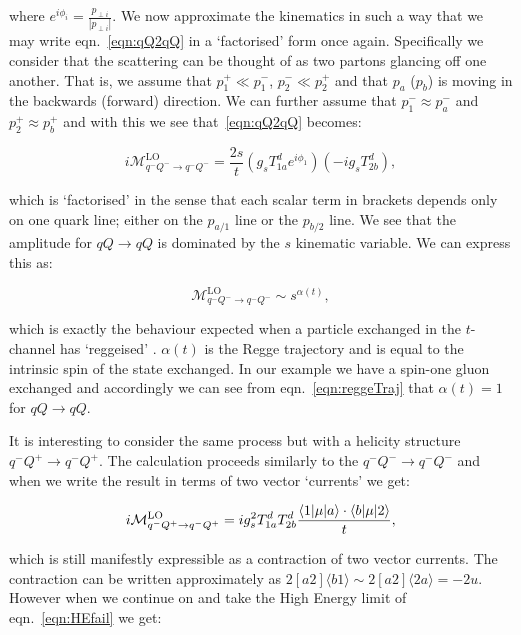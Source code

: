 		where $e^{i\phi_i} = \frac{p_{\perp i}}{|p_{\perp i}|}$.  We now approximate the kinematics in such a way that we may write
		eqn.~\eqref{eqn:qQ2qQ} in a `factorised' form once again.  Specifically we consider that the scattering can be thought
		of as two partons glancing off one another.  That is, we assume that $p_1^+\ll p_1^-$, $p_2^-\ll p_2^+$ and that $p_a$ ($p_b$)
		is moving in the backwards (forward) direction.  We can further assume that $p_1^-\approx p_a^-$ and $p_2^+\approx p_b^+$
		and with this we see that~\eqref{eqn:qQ2qQ} becomes:

		\begin{equation}
			i\mathcal{M}_{q^-Q^-\rightarrow q^-Q^-}^{\text{LO}} = \frac{2s}{t}\left(g_sT^d_{1a}e^{i\phi_1}\right)\left(-ig_sT^d_{2b}\right),
			\label{eqn:reggeTraj}
		\end{equation}

		which is `factorised' in the sense that each scalar term in brackets depends only on one quark line; either on the $p_{a/1}$
		line or the $p_{b/2}$ line.  We see that the amplitude for $qQ\rightarrow qQ$ is dominated by the $s$ kinematic variable.
		We can express this as:

		\begin{equation}
			\mathcal{M}_{q^-Q^-\rightarrow q^-Q^-}^{\text{LO}} \sim s^{\alpha(t)},
		\end{equation}

		which is exactly the behaviour expected when a particle exchanged in the $t$-channel has `reggeised'
		\cite{sabioThesis,DelDuca:1995hf,lipatovBook}.  $\alpha(t)$ is the Regge trajectory and is equal to
		the intrinsic spin of the state exchanged.  In our example we have a spin-one gluon exchanged
		and accordingly we can see from eqn.~\eqref{eqn:reggeTraj} that $\alpha(t)=1$ for $qQ\rightarrow qQ$.

		It is interesting to consider the same process but with a helicity structure $q^-Q^+\to q^-Q^+$.
		The calculation proceeds similarly to the $q^-Q^-\to q^-Q^-$ and when we write the result in
		terms of two vector `currents' we get:

		\begin{equation}
			i\mathcal{M}_{q^-Q^+\rightarrow q^-Q^+}^{\text{LO}} = ig_s^2T^d_{1a}T^d_{2b}\frac{\langle 1 | \mu | a \rangle\cdot\langle b | \mu | 2 \rangle}{t},
			\label{eqn:HEfail}
		\end{equation}

		which is still manifestly expressible as a contraction of two vector currents.  The contraction
		can be written approximately as $2[a2]\langle b1\rangle\sim2[a2]\langle2a\rangle=-2u$.
		However when we continue on and take the High Energy limit of eqn.~\eqref{eqn:HEfail} we get:

